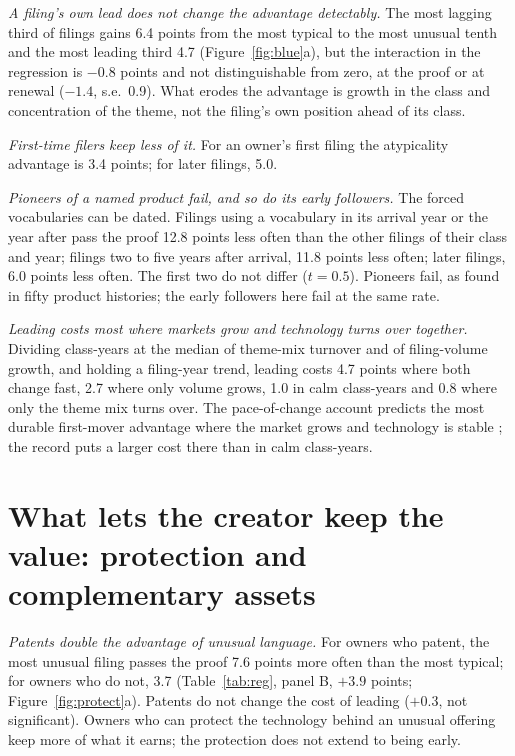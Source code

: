 \emph{A filing's own lead does not change the advantage detectably.} The
most lagging third of filings gains 6.4 points from the most typical to
the most unusual tenth and the most leading third 4.7
(Figure~\ref{fig:blue}a), but the interaction in the regression is
$-0.8$ points and not distinguishable from zero, at the proof or at
renewal ($-1.4$, s.e.\ 0.9). What erodes the advantage is growth in the
class and concentration of the theme, not the filing's own position
ahead of its class.

\emph{First-time filers keep less of it.} For an owner's first filing the
atypicality advantage is 3.4 points; for later filings, 5.0.

\emph{Pioneers of a named product fail, and so do its early followers.}
The forced vocabularies can be dated. Filings using a vocabulary in its
arrival year or the year after pass the proof 12.8 points less often
than the other filings of their class and year; filings two to five
years after arrival, 11.8 points less often; later filings, 6.0 points
less often. The first two do not differ ($t = 0.5$). Pioneers fail, as
\citet{GolderTellis1993} found in fifty product histories; the early
followers here fail at the same rate.

\emph{Leading costs most where markets grow and technology turns over
together.} Dividing class-years at the median of theme-mix turnover and
of filing-volume growth, and holding a filing-year trend, leading costs
4.7 points where both change fast, 2.7 where only volume grows, 1.0 in
calm class-years and 0.8 where only the theme mix turns over. The
pace-of-change account predicts the most durable first-mover advantage
where the market grows and technology is stable
\citep{SuarezLanzolla2007}; the record puts a larger cost there than in
calm class-years.

\section{What lets the creator keep the value: protection and
complementary assets}\label{sec:protect}

\emph{Patents double the advantage of unusual language.} For owners who
patent, the most unusual filing passes the proof 7.6 points more often
than the most typical; for owners who do not, 3.7 (Table~\ref{tab:reg},
panel B, $+3.9$ points; Figure~\ref{fig:protect}a). Patents do not change
the cost of leading ($+0.3$, not significant). Owners who can protect the
technology behind an unusual offering keep more of what it earns; the
protection does not extend to being early.

